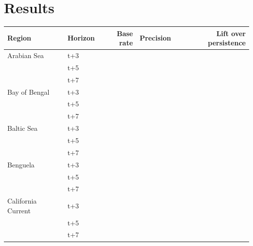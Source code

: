 \section{Results}
\label{sec:results}

\begin{wtable}
\centering
\tabscale
\caption{All \NRegions{} regions at three forecast horizons: bloom base rate
(holdout positive rate), precision at the operating point closest to recall
\HabTargetRecall{}, and skill lift over the persistence baseline (calibrated
LightGBM PR-AUC minus persistence PR-AUC), all read from each region's own
\texttt{hab\_early\_warning*\_holdout.csv} and \texttt{*\_summary.json}.}
\label{tab:regions}
\begin{tabular}{llrrr}
\toprule
Region & Horizon & Base rate & Precision & Lift over persistence \\
\midrule
Arabian Sea & t+3 & \HabArabianBaseThree{} & \HabArabianPrecThree{} & \HabArabianLiftThree{} \\
            & t+5 & \HabArabianBaseFive{}  & \HabArabianPrecFive{}  & \HabArabianLiftFive{} \\
            & t+7 & \HabArabianBaseSeven{} & \HabArabianPrecSeven{} & \HabArabianLiftSeven{} \\
\addlinespace
Bay of Bengal & t+3 & \HabBengalBaseThree{} & \HabBengalPrecThree{} & \HabBengalLiftThree{} \\
              & t+5 & \HabBengalBaseFive{}  & \HabBengalPrecFive{}  & \HabBengalLiftFive{} \\
              & t+7 & \HabBengalBaseSeven{} & \HabBengalPrecSeven{} & \HabBengalLiftSeven{} \\
\addlinespace
Baltic Sea & t+3 & \HabBalticBaseThree{} & \HabBalticPrecThree{} & \HabBalticLiftThree{} \\
           & t+5 & \HabBalticBaseFive{}  & \HabBalticPrecFive{}  & \HabBalticLiftFive{} \\
           & t+7 & \HabBalticBaseSeven{} & \HabBalticPrecSeven{} & \HabBalticLiftSeven{} \\
\addlinespace
Benguela & t+3 & \HabBenguelaBaseThree{} & \HabBenguelaPrecThree{} & \HabBenguelaLiftThree{} \\
         & t+5 & \HabBenguelaBaseFive{}  & \HabBenguelaPrecFive{}  & \HabBenguelaLiftFive{} \\
         & t+7 & \HabBenguelaBaseSeven{} & \HabBenguelaPrecSeven{} & \HabBenguelaLiftSeven{} \\
\addlinespace
California Current & t+3 & \HabCaliforniaBaseThree{} & \HabCaliforniaPrecThree{} & \HabCaliforniaLiftThree{} \\
                    & t+5 & \HabCaliforniaBaseFive{}  & \HabCaliforniaPrecFive{}  & \HabCaliforniaLiftFive{} \\
                    & t+7 & \HabCaliforniaBaseSeven{} & \HabCaliforniaPrecSeven{} & \HabCaliforniaLiftSeven{} \\
\bottomrule
\end{tabular}
\end{wtable}

